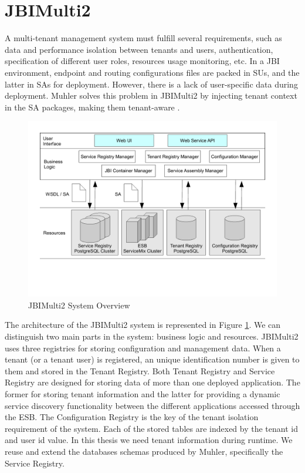 \section{JBIMulti2}
\label{sec:jbimulti2}  

A multi-tenant management system must fulfill several requirements, such as data and performance isolation between tenants and users, authentication, specification of different user roles, resources usage monitoring, etc. In a \ac{JBI} environment, endpoint and routing configurations files are packed in \ac{SU}s, and the latter in \ac{SA}s for deployment. However, there is a lack of user-specific data during deployment. Muhler solves this problem in JBIMulti2 by injecting tenant context in the \ac{SA} packages, making them tenant-aware \cite{Muhler2012}. 

\begin{figure}[htb]
	\centering
		\includegraphics[clip, scale=0.5]{./gfx/systemoverview_jbimulti2.pdf}
	\caption[JBIMulti2 System Overview]{JBIMulti2 System Overview \cite{Muhler2012}} 
	\label{fig:jbimulti2}
\end{figure}

The architecture of the JBIMulti2 system is represented in Figure \ref{fig:jbimulti2}. We can distinguish two main parts in the system: business logic and resources. JBIMulti2 uses three registries for storing configuration and management data. When a tenant (or a tenant user) is registered, an unique identification number is given to them and stored in the Tenant Registry. Both Tenant Registry and Service Registry are designed for storing data of more than one deployed application. The former for storing tenant information and the latter for providing a dynamic service discovery functionality between the different applications accessed through the \ac{ESB}. The Configuration Registry is the key of the tenant isolation requirement of the system. Each of the stored tables are indexed by the tenant id  and user id value. In this thesis we need tenant information during runtime. We reuse and extend the databases schemas produced by Muhler, specifically the Service Registry.

